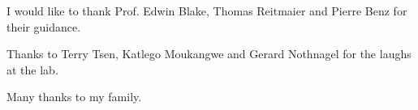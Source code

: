 
I would like to thank Prof. Edwin Blake, Thomas Reitmaier and Pierre Benz for their guidance.\newline

Thanks to Terry Tsen, Katlego Moukangwe and Gerard Nothnagel for the laughs at the lab.\newline

Many thanks to my family.